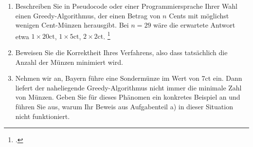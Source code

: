\documentclass{lehramt-informatik-aufgabe}
\begin{document}

\begin{enumerate}


\item Beschreiben Sie in Pseudocode oder einer Programmiersprache Ihrer
Wahl einen Greedy-Algorithmus, der einen Betrag von $n$ Cents mit
möglichst wenigen Cent-Münzen herausgibt. Bei $n = 29$ wäre die
erwartete Antwort etwa $1 \times 20 \text{ct}$, $1 \times 5 \text{ct}$,
$2 \times 2 \text{ct}$.
\footcite[Thema 1 Aufgabe 1]{examen:66115:2007:03}


\item Beweisen Sie die Korrektheit Ihres Verfahrens, also dass
tatsächlich die Anzahl der Münzen minimiert wird.


\item Nehmen wir an, Bayern führe eine Sondermünze im Wert von 7ct ein.
Dann liefert der naheliegende Greedy-Algorithmus nicht immer die
minimale Zahl von Münzen. Geben Sie für dieses Phänomen ein konkretes
Beispiel an und führen Sie aus, warum Ihr Beweis aus Aufgabenteil a) in
dieser Situation nicht funktioniert.
\end{enumerate}
\end{document}
